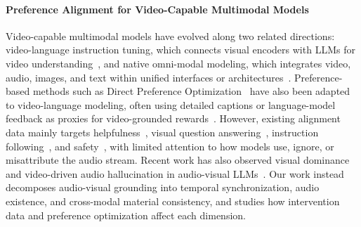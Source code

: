\paragraph{Preference Alignment for Video-Capable Multimodal Models}
Video-capable multimodal models have evolved along two related directions: video-language instruction tuning, which connects visual encoders with LLMs for video understanding~\cite{DBLP:conf/emnlp/LinYZCNJ024,DBLP:conf/nips/Dai0LTZW0FH23}, and native omni-modal modeling, which integrates video, audio, images, and text within unified interfaces or architectures~\cite{hurst2024gpt,qwenteam2026qwen35omnitechnicalreport,li2025baichuan}. Preference-based methods such as Direct Preference Optimization~\cite{rafailov2023direct} have also been adapted to video-language modeling, often using detailed captions or language-model feedback as proxies for video-grounded rewards~\cite{zhang-etal-2025-direct}. However, existing alignment data mainly targets helpfulness~\cite{DBLP:conf/nips/Ouyang0JAWMZASR22,Bai2022TrainingAH}, visual question answering~\cite{NEURIPS2023_6dcf277e}, instruction following~\cite{wei2022finetuned}, and safety~\cite{Zong2024SafetyFA,Zhu2025OmniGuardUO}, with limited attention to how models use, ignore, or misattribute the audio stream. Recent work has also observed visual dominance and video-driven audio hallucination in audio-visual LLMs~\cite{selvakumar2026audio,baid2026don}. Our work instead decomposes audio-visual grounding into temporal synchronization, audio existence, and cross-modal material consistency, and studies how intervention data and preference optimization affect each dimension.